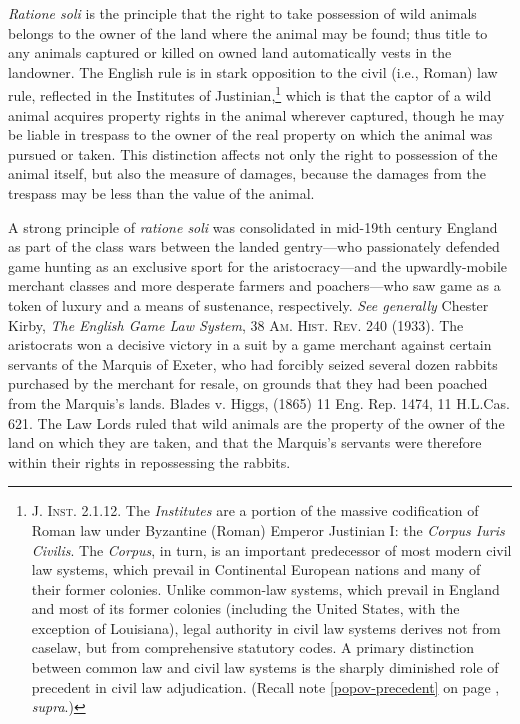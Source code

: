 
\textit{Ratione soli} is the principle that the right to take
possession of wild animals belongs to the owner of the land where the animal may
be found; thus title to any animals captured or killed on owned land
automatically vests in the landowner. The English rule is in stark opposition to
the civil (i.e., Roman) law rule, reflected in the Institutes of
Justinian,\footnote{\textsc{J. Inst.} 2.1.12. The \textit{Institutes} are a
portion of the massive codification of Roman law under Byzantine (Roman) Emperor
Justinian I: the \textit{Corpus Iuris Civilis}. The \textit{Corpus}, in turn, is
an important predecessor of most modern civil law systems, which prevail in
Continental European nations and many of their former colonies. Unlike
common-law systems, which prevail in England and most of its former colonies
(including the United States, with the exception of Louisiana), legal authority
in civil law systems derives not from caselaw, but from comprehensive statutory
codes. A primary distinction between common law and civil law systems is the
sharply diminished role of precedent in civil law adjudication. (Recall note
\ref{popov-precedent} on page \pageref{popov-precedent}, \textit{supra}.)}
which is that the captor of a wild animal acquires property rights in the animal
wherever captured, though he may be liable in trespass to the owner of the real
property on which the animal was pursued or taken. This distinction affects not
only the right to possession of the animal itself, but also the measure of
damages, because the damages from the trespass may be less than the value of the
animal.

A strong principle of \textit{ratione soli} was consolidated in mid-19th century
England as part of the class wars between the landed gentry---who passionately
defended game hunting as an exclusive sport for the aristocracy---and the
upwardly-mobile merchant classes and more desperate farmers and poachers---who
saw game as a token of luxury and a means of sustenance, respectively.
\textit{See generally} Chester Kirby, \emph{The English Game Law System}, 38
\textsc{Am. Hist. Rev.} 240 (1933). The aristocrats won a decisive victory in a
suit by a game merchant against certain servants of the Marquis of Exeter, who
had forcibly seized several dozen rabbits purchased by the merchant for resale,
on grounds that they had been poached from the Marquis's lands. Blades v. Higgs,
(1865) 11 Eng. Rep. 1474, 11 H.L.Cas. 621. The Law Lords ruled that wild animals
are the property of the owner of the land on which they are taken, and that the
Marquis's servants were therefore within their rights in repossessing the
rabbits.

